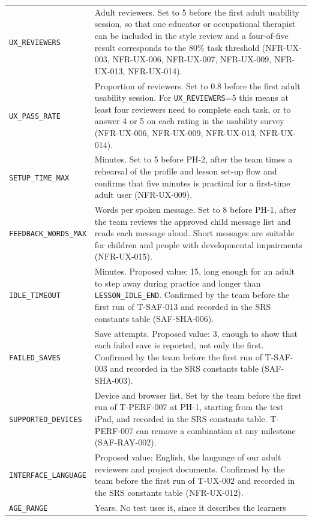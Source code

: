 \documentclass[12pt, titlepage]{article}
\begin{document}
{\begin{longtable}{@{}>{\raggedright\arraybackslash}p{}>{\raggedright\arraybackslash}p{}@{}}
\addlinespace
\texttt{UX\_REVIEWERS} & Adult reviewers. Set to 5 before the first adult
usability session, so that one educator or occupational therapist can be
included in the style review and a four-of-five result corresponds to the
80\% task threshold (NFR-UX-003, NFR-UX-006, NFR-UX-007, NFR-UX-009,
NFR-UX-013, NFR-UX-014).\\
\addlinespace
\texttt{UX\_PASS\_RATE} & Proportion of reviewers. 
Set to 0.8 before the first adult usability session. For \texttt{UX\_REVIEWERS}=5 this 
means at least four reviewers need to complete each task, or to answer 4 or 5
on each rating in the usability survey (NFR-UX-006, NFR-UX-009, NFR-UX-013,
NFR-UX-014).\\
\addlinespace
\texttt{SETUP\_TIME\_MAX} & Minutes. Set to 5 before PH-2, after the team
times a rehearsal of the profile and lesson set-up flow and confirms that
five minutes is practical for a first-time adult user (NFR-UX-009).\\
\addlinespace
\texttt{FEEDBACK\_WORDS\_MAX} & Words per spoken message. Set to 8 before
PH-1, after the team reviews the approved child message list and reads each
message aloud. Short messages are suitable for children and people with
developmental impairments (NFR-UX-015).\\
\addlinespace
\texttt{IDLE\_TIMEOUT} & Minutes. Proposed value: 15, long enough for an adult
to step away during practice and longer than \texttt{LESSON\_IDLE\_END}. Confirmed
by the team before the first run of T-SAF-013 and recorded in the SRS constants
table (SAF-SHA-006).\\
\addlinespace
\texttt{FAILED\_\allowbreak SAVES} & Save attempts. Proposed value: 3, enough to
show that each failed save is reported, not only the first. Confirmed by the team
before the first run of T-SAF-003 and recorded in the SRS constants table
(SAF-SHA-003).\\
\addlinespace
\texttt{SUPPORTED\_\allowbreak DEVICES} & Device and browser list. Set by the team before
the first run of T-PERF-007 at PH-1, starting from the test iPad, and
recorded in the SRS constants table. T-PERF-007 can remove a combination at
any milestone (SAF-RAY-002).\\
\addlinespace
\texttt{INTERFACE\_\allowbreak LANGUAGE} & Proposed value: English, the language of our adult
reviewers and project documents. Confirmed by the team before the first run
of T-UX-002 and recorded in the SRS constants table (NFR-UX-012).\\
\addlinespace
\texttt{AGE\_RANGE} & Years. No test uses it, since it describes the learners

\end{longtable}}
\end{document}

